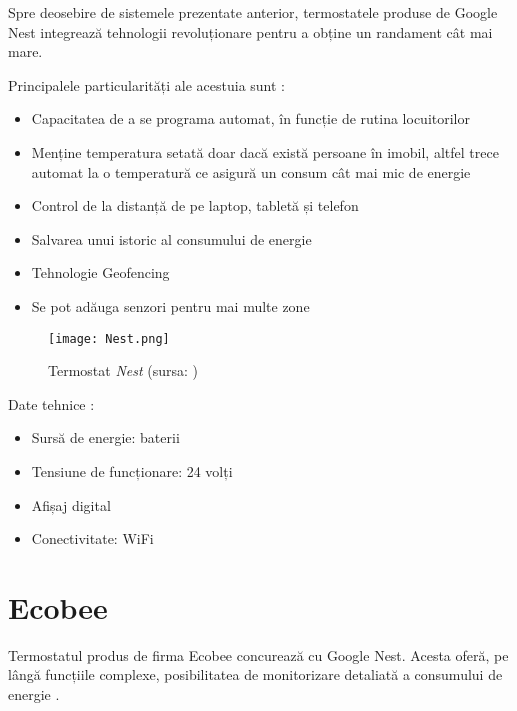 	Spre deosebire de sistemele prezentate anterior, termostatele produse de Google Nest integrează tehnologii revoluționare pentru a obține un randament cât mai mare.

\vspace{2em}

	Principalele particularități ale acestuia sunt \cite{nest}:
	\begin{itemize}
	\setlength{\itemindent}{2em}
		\itemsep0em
		\item Capacitatea de a se programa automat, în funcție de rutina locuitorilor
		\item Menține temperatura setată doar dacă există persoane în imobil, altfel trece automat la o temperatură ce asigură un consum cât mai mic de energie
		\item Control de la distanță de pe laptop, tabletă și telefon
		\item Salvarea unui istoric al consumului de energie
		\item Tehnologie Geofencing
		\item Se pot adăuga senzori pentru mai multe zone
	\end{itemize}

\vspace{1em}

\begin{wrapfigure}[5]{l}{0.5\textwidth}
	\centering
	\texttt{[image: Nest.png]}
	\caption{Termostat \textit{Nest} (sursa: \cite{nest})}
\end{wrapfigure}

	Date tehnice \cite{nest}:
	\begin{itemize}
	\setlength{\itemindent}{2em}
		\itemsep0em
		\item Sursă de energie: baterii
		\item Tensiune de funcționare: 24 volți
		\item Afișaj digital
		\item Conectivitate: WiFi
	\end{itemize}

\vspace{3em}


\section{Ecobee}
	 Termostatul produs de firma Ecobee concurează cu Google Nest. Acesta oferă, pe lângă funcțiile complexe, posibilitatea de monitorizare detaliată a consumului de energie \cite{ecobee}.
	
